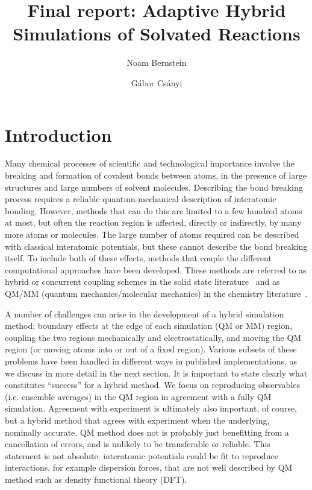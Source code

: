 \documentclass[11pt]{revtex4}
\begin{document}
\title{Final report: Adaptive Hybrid Simulations of Solvated Reactions}

\author{Noam Bernstein}

\author{G\'abor Cs\'anyi}

\maketitle

\section{Introduction}

Many chemical processes of scientific and technological importance
involve the breaking and formation of covalent bonds between atoms,
in the presence of large structures and large numbers of solvent
molecules.  Describing the bond breaking process requires a reliable
quantum-mechanical description of interatomic bonding.  However,
methods that can do this are limited to a few hundred atoms at most, but often
the reaction region is affected, directly or indirectly, by many
more atoms or molecules.  The large number of atoms required can
be described with classical interatomic potentials, but these cannot describe the bond breaking itself.  To include both of these
effects, methods that couple the different computational approaches
have been developed.  These methods are referred to as hybrid or
concurrent coupling schemes in the solid state
literature~\cite{curtin_model_simul_mater_sci_eng_2003a,csanyi_j_phys_condens_mater_2005a,bernstein_rep_prog_phys_2009a} and
as QM/MM (quantum mechanics/molecular mechanics) in the chemistry
literature~\cite{senn_topics_cur_chem_2007a,lin_theor_chem_acc_2005a}.

A number of challenges can arise in the development of a hybrid
simulation method: boundary effects at the edge of each simulation
(QM or MM) region, coupling the two regions mechanically and
electrostatically, and moving the QM region (or moving atoms into
or out of a fixed region).  Various subsets of these problems have
been handled in different ways in published implementations, as we
discuss in more detail in the next section.  It is important to
state clearly what constitutes ``success'' for a hybrid method.  We focus
on reproducing observables (i.e. ensemble averages) in the QM region
in agreement with a fully QM simulation.  Agreement with experiment
is ultimately also important, of course, but a hybrid method that agrees with
experiment when the underlying, nominally accurate, QM method does
not is probably just benefitting from a cancellation of errors, and
is unlikely to be transferable or reliable.  This statement is not
absolute: interatomic potentials could be fit to reproduce interactions,
for example dispersion forces, that are not well described by QM
method such as density functional theory (DFT).
\end{document}
